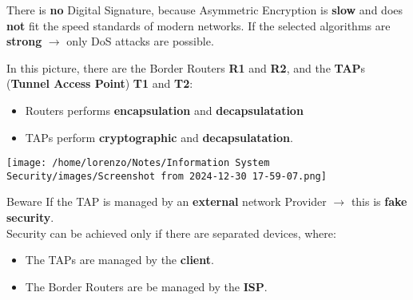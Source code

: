 \begin{itemize}
    There is \textbf{no} Digital Signature, because Asymmetric Encryption is \textbf{slow} and does \textbf{not} fit the
speed standards of modern networks. If the selected algorithms are \textbf{strong} \(\rightarrow \) only DoS attacks are possible.\\
\begin{minipage}{0.6\textwidth}
        In this picture, there are the Border Routers \textbf{R1} and \textbf{R2}, and the \textbf{TAP}s (\textbf{Tunnel Access Point}) \textbf{T1} and \textbf{T2}:
        \begin{itemize}
            \item Routers performs \textbf{encapsulation} and \textbf{decapsulatation}
            \item TAPs perform \textbf{cryptographic} and \textbf{decapsulatation}.
        \end{itemize}
    \end{minipage} 
    \hspace{0.2cm}
    \begin{minipage}{0.4\textwidth}
        \centering
        \texttt{[image: /home/lorenzo/Notes/Information System Security/images/Screenshot from 2024-12-30 17-59-07.png]}
    \end{minipage}
    \begin{quotebox-red}{Beware}
        If the TAP is managed by an \textbf{external} network Provider \(\rightarrow \) this is \textbf{fake security}.\\
        Security can be achieved only if there are separated devices, where:
        \begin{itemize}
            \item The TAPs are managed by the \textbf{client}.
            \item The Border Routers are be managed by the \textbf{ISP}.
        \end{itemize}
    \end{quotebox-red}
\end{itemize}
\noindent{\color{gray!50}\rule{\textwidth}{0.5pt}}
